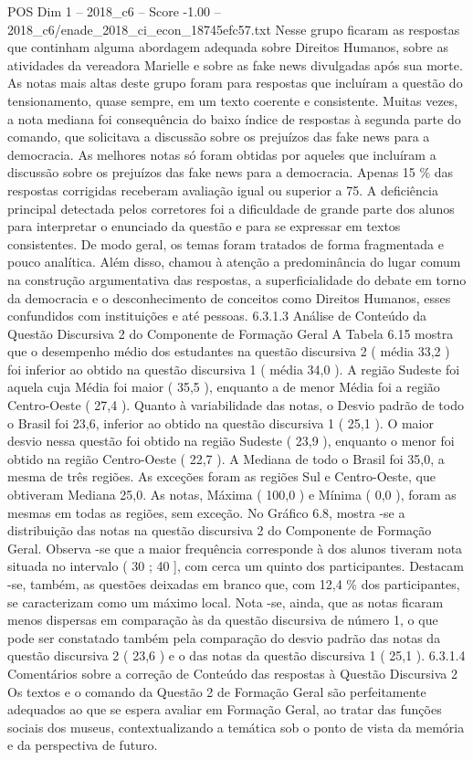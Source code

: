 \begin{textsample}{POS Dim 1 – 2018\_c6 – Score -1.00 – 2018\_c6/enade\_2018\_ci\_econ\_18745efc57.txt}
Nesse grupo ficaram as respostas que continham alguma abordagem adequada sobre Direitos Humanos, sobre as atividades da vereadora Marielle e sobre as fake news divulgadas após sua morte.
As notas mais altas deste grupo foram para respostas que incluíram a questão do tensionamento, quase sempre, em um texto coerente e consistente.
Muitas vezes, a nota mediana foi consequência do baixo índice de respostas à segunda parte do comando, que solicitava a discussão sobre os prejuízos das fake news para a democracia.
As melhores notas só foram obtidas por aqueles que incluíram a discussão sobre os prejuízos das fake news para a democracia.
Apenas 15 \% das respostas corrigidas receberam avaliação igual ou superior a 75.
A deficiência principal detectada pelos corretores foi a dificuldade de grande parte dos alunos para interpretar o enunciado da questão e para se expressar em textos consistentes.
De modo geral, os temas foram tratados de forma fragmentada e pouco analítica.
Além disso, chamou à atenção a predominância do lugar comum na construção argumentativa das respostas, a superficialidade do debate em torno da democracia e o desconhecimento de conceitos como Direitos Humanos, esses confundidos com instituições e até pessoas. 6.3.1.3 Análise de Conteúdo da Questão Discursiva 2 do Componente de Formação Geral A Tabela 6.15 mostra que o desempenho médio dos estudantes na questão discursiva 2 ( média 33,2 ) foi inferior ao obtido na questão discursiva 1 ( média 34,0 ).
A região Sudeste foi aquela cuja Média foi maior ( 35,5 ), enquanto a de menor Média foi a região Centro-Oeste ( 27,4 ).
Quanto à variabilidade das notas, o Desvio padrão de todo o Brasil foi 23,6, inferior ao obtido na questão discursiva 1 ( 25,1 ).
O maior desvio nessa questão foi obtido na região Sudeste ( 23,9 ), enquanto o menor foi obtido na região Centro-Oeste ( 22,7 ).
A Mediana de todo o Brasil foi 35,0, a mesma de três regiões.
As exceções foram as regiões Sul e Centro-Oeste, que obtiveram Mediana 25,0.
As notas, Máxima ( 100,0 ) e Mínima ( 0,0 ), foram as mesmas em todas as regiões, sem exceção.
No Gráfico 6.8, mostra -se a distribuição das notas na questão discursiva 2 do Componente de Formação Geral.
Observa -se que a maior frequência corresponde à dos alunos tiveram nota situada no intervalo ( 30 ; 40 ], com cerca um quinto dos participantes.
Destacam -se, também, as questões deixadas em branco que, com 12,4 \% dos participantes, se caracterizam como um máximo local.
Nota -se, ainda, que as notas ficaram menos dispersas em comparação às da questão discursiva de número 1, o que pode ser constatado também pela comparação do desvio padrão das notas da questão discursiva 2 ( 23,6 ) e o das notas da questão discursiva 1 ( 25,1 ). 6.3.1.4 Comentários sobre a correção de Conteúdo das respostas à Questão Discursiva 2 Os textos e o comando da Questão 2 de Formação Geral são perfeitamente adequados ao que se espera avaliar em Formação Geral, ao tratar das funções sociais dos museus, contextualizando a temática sob o ponto de vista da memória e da perspectiva de futuro.

\end{textsample}
